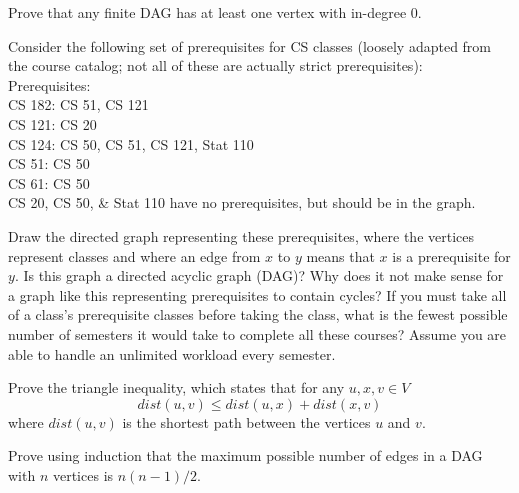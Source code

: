 \documentclass[solution, letterpaper]{cs20inclass}
\begin{document}
\problem
Prove that any finite DAG has at least one vertex with in-degree 0.


\begin{solution}
\end{solution}

\problem
Consider the following set of prerequisites for CS classes (loosely adapted from the course catalog; not all of these are actually strict prerequisites): \\
Prerequisites: \\
CS 182: CS 51, CS 121 \\
CS 121: CS 20 \\
CS 124: CS 50, CS 51, CS 121, Stat 110 \\
CS 51: CS 50 \\
CS 61: CS 50 \\
CS 20, CS 50, \& Stat 110 have no prerequisites, but should be in the graph.

\subproblem Draw the directed graph representing these prerequisites, where the vertices represent classes and where an edge from $x$ to $y$ means that $x$ is a prerequisite for $y$.
\subproblem Is this graph a directed acyclic graph (DAG)? Why does it not make sense for a graph like this representing prerequisites to contain cycles?
\subproblem If you must take all of a class's prerequisite classes before taking the class, what is the fewest possible number of semesters it would take to complete all these courses? Assume you are able to handle an unlimited workload every semester.

\begin{solution}
\end{solution}

\problem Prove the triangle inequality, which states that for any $u, x, v \in V$
\[dist(u, v) \le dist(u, x) + dist(x, v)\]
where $dist(u,v)$ is the shortest path between the vertices $u$ and $v$.

\begin{solution}
\end{solution}

\problem Prove using induction that the maximum possible number of edges in a DAG with $n$ vertices is $n(n-1)/2$. 


\begin{solution}
\end{solution}
\end{document}
